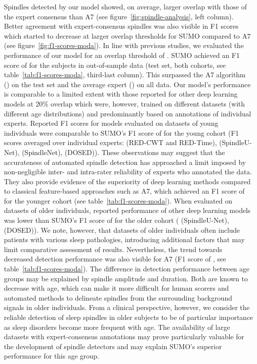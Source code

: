 \documentclass[fleqn,twocolumn,10pt]{wlscirep}
\begin{document}
Spindles detected by our model showed, on average, larger overlap with those
of the expert consensus than A7 (see figure~\ref{fig:spindle-analysis}, left
column).
Better agreement with expert-consensus spindles was also visible in F1 scores
which started to decrease at larger overlap thresholds for SUMO compared to A7
(see figure~\ref{fig:f1-scores-moda}).
In line with previous
studies\cite{Warby2014,Lacourse2019,Lacourse2020,Tapia2020}, we evaluated the
performance of our model for an overlap threshold of .
SUMO achieved an F1 score of  for the subjects in out-of-sample data (test
set, both cohorts, see table~\ref{tab:f1-scores-moda}, third-last column).
This surpassed the A7 algorithm () on the test set and the average expert
() on all data.
Our model's performance is comparable to a limited extent with those reported
for other deep learning models at 20\% overlap which were, however, trained on
different datasets (with different age distributions) and predominantly based on
annotations of individual experts.
Reported F1 scores for models evaluated on datasets of young individuals were
comparable to SUMO's F1 score of  for the young cohort (F1 scores averaged
over individual experts:  (RED-CWT and RED-Time)\cite{Tapia2020}, 
(SpindleU-Net)\cite{You2021},  (SpindleNet)\cite{Tapia2020}, 
(DOSED)\cite{Tapia2020}).
These observations may suggest that the accurateness of automated spindle
detection has approached a limit imposed by non-negligible inter- and
intra-rater reliability of experts who annotated the data.
They also provide evidence of the superiority of deep learning
methods compared to classical feature-based approaches such as A7, which
achieved an F1 score of  for the younger cohort (see
table~\ref{tab:f1-scores-moda}).
When evaluated on datasets of older individuals, reported performance of other
deep learning models was lower than SUMO's F1 score of  for the older
cohort ( (SpindleU-Net)\cite{You2021}, 
(DOSED)\cite{Chambon2019}).
We note, however, that datasets of older individuals often include patients with
various sleep pathologies, introducing additional factors that may limit
comparative assessment of results.
Nevertheless, the trend towards decreased detection performance was also visible
for A7 (F1 score of , see table~\ref{tab:f1-scores-moda}).
The difference in detection performance between age groups may be explained by
spindle amplitude and duration.
Both are known to decrease with age\cite{Nicolas2001,Crowley2002}, which can
make it more difficult for human scorers and automated methods to delineate
spindles from the surrounding background signals in older
individuals\cite{Wendt2015}.
From a clinical perspective, however, we consider the reliable detection of sleep
spindles in older subjects to be of particular importance as sleep disorders
become more frequent with age.
The availability of large datasets with expert-consensus annotations may prove
particularly valuable for the development of spindle detectors and may explain
SUMO's superior performance for this age group.
\end{document}
